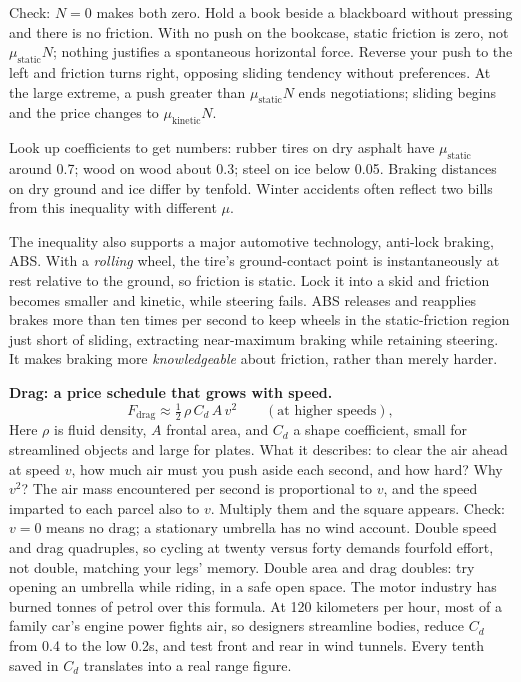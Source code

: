 Check: \(N=0\) makes both zero. Hold a book beside a blackboard without pressing and there is no friction. With no push on the bookcase, static friction is zero, not \(\mu_{\text{static}}N\); nothing justifies a spontaneous horizontal force. Reverse your push to the left and friction turns right, opposing sliding tendency without preferences. At the large extreme, a push greater than \(\mu_{\text{static}}N\) ends negotiations; sliding begins and the price changes to \(\mu_{\text{kinetic}}N\).

Look up coefficients to get numbers: rubber tires on dry asphalt have \(\mu_{\text{static}}\) around 0.7; wood on wood about 0.3; steel on ice below 0.05. Braking distances on dry ground and ice differ by tenfold. Winter accidents often reflect two bills from this inequality with different \(\mu\).

The inequality also supports a major automotive technology, anti-lock braking, ABS. With a \emph{rolling} wheel, the tire's ground-contact point is instantaneously at rest relative to the ground, so friction is static. Lock it into a skid and friction becomes smaller and kinetic, while steering fails. ABS releases and reapplies brakes more than ten times per second to keep wheels in the static-friction region just short of sliding, extracting near-maximum braking while retaining steering. It makes braking more \emph{knowledgeable} about friction, rather than merely harder.

\textbf{Drag: a price schedule that grows with speed.}
\[
F_{\text{drag}}\approx \tfrac12\,\rho\, C_d\, A\, v^2 \qquad(\text{at higher speeds}),
\]
Here \(\rho\) is fluid density, \(A\) frontal area, and \(C_d\) a shape coefficient, small for streamlined objects and large for plates. What it describes: to clear the air ahead at speed \(v\), how much air must you push aside each second, and how hard? Why \(v^2\)? The air mass encountered per second is proportional to \(v\), and the speed imparted to each parcel also to \(v\). Multiply them and the square appears. Check: \(v=0\) means no drag; a stationary umbrella has no wind account. Double speed and drag quadruples, so cycling at twenty versus forty demands fourfold effort, not double, matching your legs' memory. Double area and drag doubles: try opening an umbrella while riding, in a safe open space. The motor industry has burned tonnes of petrol over this formula. At 120 kilometers per hour, most of a family car's engine power fights air, so designers streamline bodies, reduce \(C_d\) from 0.4 to the low 0.2s, and test front and rear in wind tunnels. Every tenth saved in \(C_d\) translates into a real range figure.

